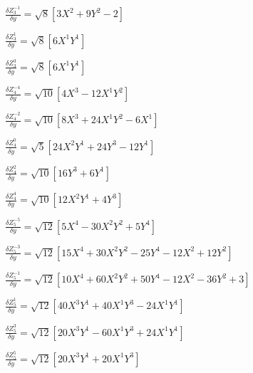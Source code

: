 \documentclass[10pt,landscape]{article}
\begin{document}
\vspace{1.2 mm}
\noindent $ \frac{\delta Z^{-1}_{3}}{\delta y} = \sqrt{8} [3X^{2} +9Y^{2} -2] $

\vspace{1.2 mm}
\noindent $ \frac{\delta Z^{1}_{3}}{\delta y} = \sqrt{8} [6X^{1}Y^{1}] $

\vspace{1.2 mm}
\noindent $ \frac{\delta Z^{3}_{3}}{\delta y} = \sqrt{8} [6X^{1}Y^{1}] $

\vspace{1.2 mm}
\noindent $ \frac{\delta Z^{-4}_{4}}{\delta y} = \sqrt{10} [4X^{3} -12X^{1}Y^{2}] $

\vspace{1.2 mm}
\noindent $ \frac{\delta Z^{-2}_{4}}{\delta y} = \sqrt{10} [8X^{3} +24X^{1}Y^{2} -6X^{1}] $

\vspace{1.2 mm}
\noindent $ \frac{\delta Z^{0}_{4}}{\delta y} = \sqrt{5} [24X^{2}Y^{1} +24Y^{3} -12Y^{1}] $

\vspace{1.2 mm}
\noindent $ \frac{\delta Z^{2}_{4}}{\delta y} = \sqrt{10} [16Y^{3} +6Y^{1}] $

\vspace{1.2 mm}
\noindent $ \frac{\delta Z^{4}_{4}}{\delta y} = \sqrt{10} [12X^{2}Y^{1} +4Y^{3}] $

\vspace{1.2 mm}
\noindent $ \frac{\delta Z^{-5}_{5}}{\delta y} = \sqrt{12} [5X^{4} -30X^{2}Y^{2} +5Y^{4}] $

\vspace{1.2 mm}
\noindent $ \frac{\delta Z^{-3}_{5}}{\delta y} = \sqrt{12} [15X^{4} +30X^{2}Y^{2} -25Y^{4} -12X^{2} +12Y^{2}] $

\vspace{1.2 mm}
\noindent $ \frac{\delta Z^{-1}_{5}}{\delta y} = \sqrt{12} [10X^{4} +60X^{2}Y^{2} +50Y^{4} -12X^{2} -36Y^{2} +3] $

\vspace{1.2 mm}
\noindent $ \frac{\delta Z^{1}_{5}}{\delta y} = \sqrt{12} [40X^{3}Y^{1} +40X^{1}Y^{3} -24X^{1}Y^{1}] $

\vspace{1.2 mm}
\noindent $ \frac{\delta Z^{3}_{5}}{\delta y} = \sqrt{12} [20X^{3}Y^{1} -60X^{1}Y^{3} +24X^{1}Y^{1}] $

\vspace{1.2 mm}
\noindent $ \frac{\delta Z^{5}_{5}}{\delta y} = \sqrt{12} [20X^{3}Y^{1} +20X^{1}Y^{3}] $
\end{document}
